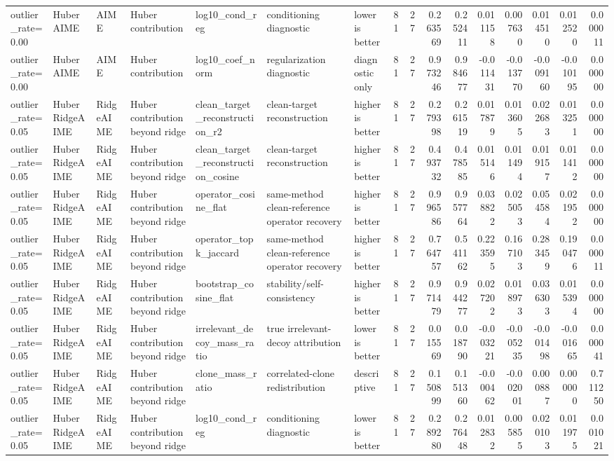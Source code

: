 \begin{table}[t]
\begin{tabular}{lllllllrrrrrrrrr}
outlier_rate=0.00 & HuberAIME & AIME & Huber contribution & log10_cond_reg & conditioning diagnostic & lower is better & 81 & 27 & 0.263569 & 0.252411 & 0.011158 & 0.007630 & 0.014510 & 0.012520 & 0.000011 \\
outlier_rate=0.00 & HuberAIME & AIME & Huber contribution & log10_coef_norm & regularization diagnostic & diagnostic only & 81 & 27 & 0.973246 & 0.984677 & -0.011431 & -0.013770 & -0.009160 & -0.010195 & 0.000000 \\
outlier_rate=0.05 & HuberRidgeAIME & RidgeAIME & Huber contribution beyond ridge & clean_target_reconstruction_r2 & clean-target reconstruction & higher is better & 81 & 27 & 0.279398 & 0.261519 & 0.017879 & 0.013605 & 0.022683 & 0.013251 & 0.000000 \\
outlier_rate=0.05 & HuberRidgeAIME & RidgeAIME & Huber contribution beyond ridge & clean_target_reconstruction_cosine & clean-target reconstruction & higher is better & 81 & 27 & 0.493732 & 0.478585 & 0.015146 & 0.011494 & 0.019157 & 0.011412 & 0.000000 \\
outlier_rate=0.05 & HuberRidgeAIME & RidgeAIME & Huber contribution beyond ridge & operator_cosine_flat & same-method clean-reference operator recovery & higher is better & 81 & 27 & 0.996586 & 0.957764 & 0.038822 & 0.025053 & 0.054584 & 0.021952 & 0.000000 \\
outlier_rate=0.05 & HuberRidgeAIME & RidgeAIME & Huber contribution beyond ridge & operator_topk_jaccard & same-method clean-reference operator recovery & higher is better & 81 & 27 & 0.764757 & 0.541162 & 0.223595 & 0.167103 & 0.283459 & 0.190476 & 0.000011 \\
outlier_rate=0.05 & HuberRidgeAIME & RidgeAIME & Huber contribution beyond ridge & bootstrap_cosine_flat & stability/self-consistency & higher is better & 81 & 27 & 0.971479 & 0.944277 & 0.027202 & 0.018973 & 0.036303 & 0.015394 & 0.000000 \\
outlier_rate=0.05 & HuberRidgeAIME & RidgeAIME & Huber contribution beyond ridge & irrelevant_decoy_mass_ratio & true irrelevant-decoy attribution & lower is better & 81 & 27 & 0.015569 & 0.018790 & -0.003221 & -0.005235 & -0.001498 & -0.001665 & 0.000041 \\
outlier_rate=0.05 & HuberRidgeAIME & RidgeAIME & Huber contribution beyond ridge & clone_mass_ratio & correlated-clone redistribution & descriptive & 81 & 27 & 0.150899 & 0.151360 & -0.000462 & -0.002001 & 0.000887 & 0.000000 & 0.711250 \\
outlier_rate=0.05 & HuberRidgeAIME & RidgeAIME & Huber contribution beyond ridge & log10_cond_reg & conditioning diagnostic & lower is better & 81 & 27 & 0.289280 & 0.276448 & 0.012832 & 0.005855 & 0.020103 & 0.011975 & 0.001021 \\

\end{tabular}
\end{table}
